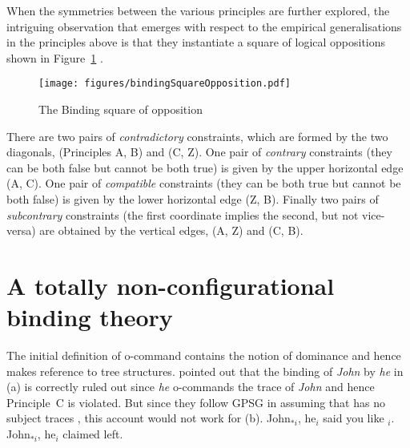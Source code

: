 \documentclass[output=paper
 	        ,biblatex
                ,babelshorthands
                ,newtxmath
                ,draftmode
                ,colorlinks, citecolor=brown
]{langscibook}
\begin{document}
When the symmetries between the various principles are further explored, the intriguing observation
that emerges with respect to the empirical generalisations in the principles above is that they
instantiate a square of logical oppositions shown in
Figure~\ref{bindingSquareOpposition} \parencites[Section~11.4]{BM99a}[]{Branco2006a-u}.
\begin{figure}
\centerline{\texttt{[image: figures/bindingSquareOpposition.pdf]}}
\caption{The Binding square of opposition}\label{bindingSquareOpposition}
\end{figure}
There are two pairs of \emph{contradictory} constraints, which are formed
by the two diagonals, (Principles A, B) and (C, Z). One pair of \emph{contrary}
constraints (they can be both false but cannot be both true) is given
by the upper horizontal edge (A, C).  One pair of \emph{compatible}
constraints (they can be both true but cannot be both false) is given
by the lower horizontal edge (Z, B). Finally two pairs of
\emph{subcontrary} constraints (the first coordinate implies the second,
but not vice-versa) are obtained by the vertical edges, (A, Z) and (C, B).






\section{A totally non-configurational binding theory}
\label{sec-totally-non-configurational-BT}

The initial definition of o-command contains the notion of dominance and hence makes reference to
tree structures. \citet[]{ps2} pointed out that the binding of \emph{John} by \emph{he} in
(a) is correctly ruled out since \emph{he} o-commands the trace of \emph{John} and hence
Principle~C is violated. But since they follow GPSG in assuming that  has no subject traces
\citep[Chapter~4.4]{ps2}, this account would not work for (b). 
\eal
\label{ex-subject-object-extraction-traceless}
\ex John$_{*i}$, he$_i$ said you like \trace$_i$.
\ex John$_{*i}$, he$_i$ claimed left.
\zl
{}
\end{document}
